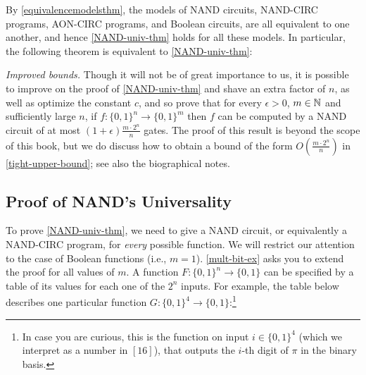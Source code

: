 By \cref{equivalencemodelsthm}, the models of NAND circuits, NAND-CIRC
programs, AON-CIRC programs, and Boolean circuits, are all equivalent to
one another, and hence \cref{NAND-univ-thm} holds for all these models.
In particular, the following theorem is equivalent to
\cref{NAND-univ-thm}:

\hypertarget{circuit-univ-thm}{}

\hypertarget{finitecomputation}{}

\emph{Improved bounds.} Though it will not be of great importance to us,
it is possible to improve on the proof of \cref{NAND-univ-thm} and shave
an extra factor of \(n\), as well as optimize the constant \(c\), and so
prove that for every \(\epsilon>0\), \(m\in {\mathbb{N}}\) and sufficiently large
\(n\), if \(f:\{0,1\}^n \rightarrow \{0,1\}^m\) then \(f\) can be
computed by a NAND circuit of at most
\((1+\epsilon)\tfrac{m\cdot 2^n}{n}\) gates. The proof of this result is
beyond the scope of this book, but we do discuss how to obtain a bound
of the form \(O(\tfrac{m \cdot 2^n}{n})\) in \cref{tight-upper-bound};
see also the biographical notes.

\subsection{Proof of NAND's
Universality}\label{Proof-of-NANDs-Universali}

To prove \cref{NAND-univ-thm}, we need to give a NAND circuit, or
equivalently a NAND-CIRC program, for \emph{every} possible function. We
will restrict our attention to the case of Boolean functions (i.e.,
\(m=1\)). \cref{mult-bit-ex} asks you to extend the proof for all values
of \(m\). A function \(F: \{0,1\}^n\rightarrow \{0,1\}\) can be
specified by a table of its values for each one of the \(2^n\) inputs.
For example, the table below describes one particular function
\(G: \{0,1\}^4 \rightarrow \{0,1\}\):\footnote{In case you are curious,
  this is the function on input \(i\in \{0,1\}^4\) (which we interpret
  as a number in \([16]\)), that outputs the \(i\)-th digit of \(\pi\)
  in the binary basis.}

